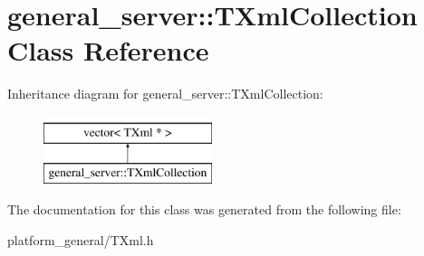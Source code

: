 \hypertarget{classgeneral__server_1_1TXmlCollection}{\section{general\-\_\-server\-:\-:\-T\-Xml\-Collection \-Class \-Reference}
\label{classgeneral__server_1_1TXmlCollection}
}
\-Inheritance diagram for general\-\_\-server\-:\-:\-T\-Xml\-Collection\-:\begin{figure}[H]
\begin{center}
\leavevmode
\includegraphics[height=2.000000cm]{classgeneral__server_1_1TXmlCollection}
\end{center}
\end{figure}


\-The documentation for this class was generated from the following file\-:\begin{DoxyCompactItemize}
\item 
platform\-\_\-general/\-T\-Xml.\-h\end{DoxyCompactItemize}
